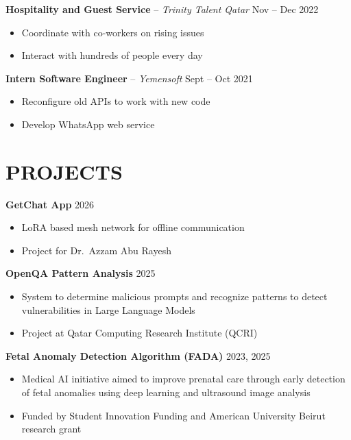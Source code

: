 \documentclass[11pt,a4paper]{article}
\begin{document}
\vspace{4pt}

\textbf{Hospitality and Guest Service} -- \textit{Trinity Talent Qatar} \hfill Nov -- Dec 2022
\begin{itemize}[leftmargin=2em, nosep, label={}]
    \item Coordinate with co-workers on rising issues
    \item Interact with hundreds of people every day
\end{itemize}

\vspace{4pt}

\textbf{Intern Software Engineer} -- \textit{Yemensoft} \hfill Sept -- Oct 2021
\begin{itemize}[leftmargin=2em, nosep, label={}]
    \item Reconfigure old APIs to work with new code
    \item Develop WhatsApp web service
\end{itemize}

\newpage

\section*{PROJECTS}

\textbf{GetChat App} \hfill 2026
\begin{itemize}[leftmargin=2em, nosep, label={}]
    \item LoRA based mesh network for offline communication
    \item Project for Dr.\ Azzam Abu Rayesh
\end{itemize}

\vspace{4pt}

\textbf{OpenQA Pattern Analysis} \hfill 2025
\begin{itemize}[leftmargin=2em, nosep, label={}]
    \item System to determine malicious prompts and recognize patterns to detect vulnerabilities in Large Language Models
    \item Project at Qatar Computing Research Institute (QCRI)
\end{itemize}

\vspace{4pt}

\textbf{Fetal Anomaly Detection Algorithm (FADA)} \hfill 2023, 2025
\begin{itemize}[leftmargin=2em, nosep, label={}]
    \item Medical AI initiative aimed to improve prenatal care through early detection of fetal anomalies using deep learning and ultrasound image analysis
    \item Funded by Student Innovation Funding and American University Beirut research grant
\end{itemize}
\end{document}
